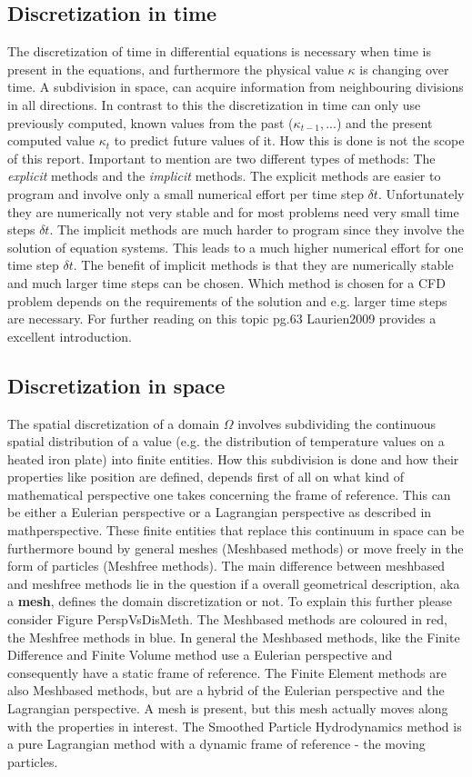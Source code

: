 \subsection{Discretization in time}
The discretization of time in differential equations is necessary when time is present in the equations, and furthermore the physical value $ \kappa $ is changing over time.
A subdivision in space, can acquire information from neighbouring divisions in all directions. In contrast to this the discretization in time can only use previously
computed, known values from the past ($ \kappa_{t-1} , ... $) and the present computed value  $ \kappa_{t} $ to predict future values of it. How this is done is not the scope of this
report. Important to mention are two different types of methods: The \emph{explicit} methods and the \emph{implicit} methods. The explicit methods are easier to program
and involve only a small numerical effort per time step $ \delta t $. Unfortunately they are numerically not very stable and for most problems need very small time steps $ \delta t $. The implicit methods are much harder to program since they involve the solution of equation systems. This leads to a much higher numerical effort for one time step $ \delta t $. The benefit of implicit methods is that they are numerically stable and much larger time steps can be chosen. Which method is chosen for a CFD problem depends on the requirements of the solution and e.g. larger time steps are necessary. For further reading on this topic pg.63 Laurien2009 provides a excellent introduction.


\subsection{Discretization in space}
The spatial discretization of a domain $ \Omega $ involves subdividing the continuous spatial distribution of a value (e.g. the distribution of temperature values on a heated iron plate) into finite entities. How this subdivision is done and how their properties like position are defined, depends first of all on what kind of
mathematical perspective one takes concerning the frame of reference. This can be either a Eulerian perspective or a Lagrangian perspective as described in mathperspective. These finite entities that replace this continuum in space can be furthermore bound by general meshes (Meshbased methods) or move freely in the form of particles (Meshfree methods). The main difference between meshbased and meshfree methods lie in the question if a overall geometrical description, aka a \textbf{mesh}, defines the domain discretization or not.
To explain this further please consider Figure PerspVsDisMeth. The Meshbased methods are coloured in red, the Meshfree methods in blue. In general the Meshbased methods, like the Finite Difference and Finite Volume method use a Eulerian perspective and consequently have a static frame of reference. The Finite Element methods are also Meshbased methods, but are a hybrid of the Eulerian perspective and the Lagrangian perspective. A mesh is present, but this mesh actually moves along with the properties in interest. The Smoothed Particle Hydrodynamics method is a pure Lagrangian method with a dynamic frame of reference - the moving particles. 


